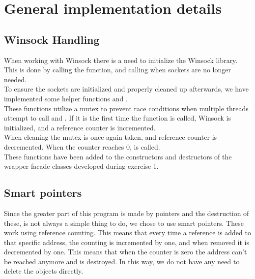 \documentclass[Main]{subfiles}
\begin{document}
\section{General implementation details}\label{sec:generalImpDetails}

\subsection{Winsock Handling}
When working with Winsock there is a need to initialize the Winsock library.
This is done by calling the  function, and calling  when sockets are no longer needed.\\
To ensure the sockets are initialized and properly cleaned up afterwards, 
we have implemented some helper functions  and .\\
These functions utilize a mutex to prevent race conditions when multiple threads attempt to call  and .
If it is the first time the function is called, Winsock is initialized, and a reference counter is incremented.\\
When cleaning the mutex is once again taken, and reference counter is decremented. When the counter reaches 0,  is called.\\
These functions have been added to the constructors and destructors of the wrapper facade classes developed during exercise 1.

\subsection{Smart pointers}
Since the greater part of this program is made by pointers and the destruction of these, is not always a simple thing to do, we chose to use smart pointers. 
These work using reference counting.
This means that every time a reference is added to that specific address, the counting is incremented by one, and when removed it is decremented by one. This means that when the counter is zero the address can't be reached anymore and is destroyed. In this way, we do not have any need to delete the objects directly.
\end{document}
